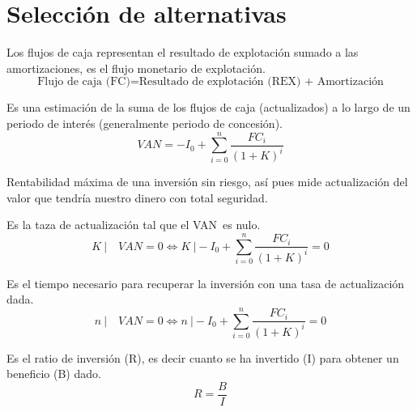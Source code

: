 \section{Selección de alternativas} %
\label{sec:selection_of_alternatives}

\begin{mydef}
	Los flujos de caja representan el resultado de explotación sumado a las amortizaciones, es el flujo monetario de explotación.
	\[
		\text{Flujo de caja (FC)}= \text{Resultado de explotación (REX) + Amortización}
	\]
\end{mydef}

\begin{mydef}
	Es una estimación de la suma de los flujos de caja (actualizados) a lo largo de un periodo de interés (generalmente periodo de concesión).
	\[
		VAN = -I_0+ \sum_{i=0}^n \frac{FC_i}{(1+K)^i}
	\]
\end{mydef}

\begin{mydef}
	Rentabilidad máxima de una inversión sin riesgo, así pues mide actualización del valor que tendría nuestro dinero con total seguridad.
\end{mydef}

\begin{mydef}
	Es la taza de actualización tal que el VAN es nulo.
	\[
		K \ | \quad VAN=0 \Leftrightarrow K \ | -I_0+ \sum_{i=0}^n \frac{FC_i}{(1+K)^i}=0
	\]
\end{mydef}

\begin{mydef}[Payback]
	Es el tiempo necesario para recuperar la inversión con una tasa de actualización dada.
	\[
		n \ | \quad VAN=0 \Leftrightarrow n \ | -I_0+ \sum_{i=0}^n \frac{FC_i}{(1+K)^i}=0
	\]
\end{mydef}

\begin{mydef}[Rentabilidad]
	Es el ratio de inversión (R), es decir cuanto se ha invertido (I) para obtener un beneficio (B) dado.
	\[
		R= \frac{B}{I}
	\]
\end{mydef}


